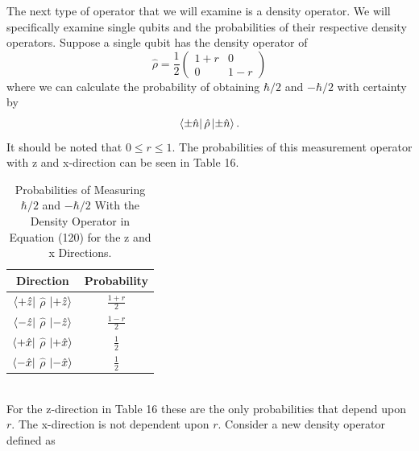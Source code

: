 \documentclass[twocolumn]{article}
\begin{document}
The next type of operator that we will examine is a density operator. We will specifically examine single qubits and the probabilities of their respective density operators. Suppose a single qubit has the density operator of
\begin{equation}
\hat{\rho}=\frac{1}{2}
\begin{pmatrix}
1+r & 0 \\
0 & 1-r
\end{pmatrix}
\end{equation}
where we can calculate the probability of obtaining $\hbar/2$ and $-\hbar/2$ with certainty by
\begin{equation}
\bra{\pm \hat{n}} \hat{\rho} \ket{\pm \hat{n}}.
\end{equation}
It should be noted that $0 \leq r \leq 1$. The probabilities of this measurement operator with z and x-direction can be seen in Table 16.
\begin{table}[h!]
\begin{center}
\begin{tabular}{ |c|c| }
\hline Direction & Probability \\
\hline $\bra{+\hat{z}}$ $\hat{\rho}$ $\ket{+\hat{z}}$ & $\frac{1+r}{2}$ \\
\hline $\bra{-\hat{z}}$ $\hat{\rho}$ $\ket{-\hat{z}}$ & $\frac{1-r}{2}$ \\
\hline $\bra{+\hat{x}}$ $\hat{\rho}$ $\ket{+\hat{x}}$ & $\frac{1}{2}$ \\
\hline $\bra{-\hat{x}}$ $\hat{\rho}$ $\ket{-\hat{x}}$ & $\frac{1}{2}$ \\
\hline
\end{tabular}
\caption{Probabilities of Measuring $\hbar/2$ and $-\hbar/2$ With the Density Operator in Equation (120) for the z and x Directions.}
\end{center}
\end{table} \\
For the z-direction in Table 16 these are the only probabilities that depend upon $r$. The x-direction is not dependent upon $r$. Consider a new density operator defined as
\end{document}
